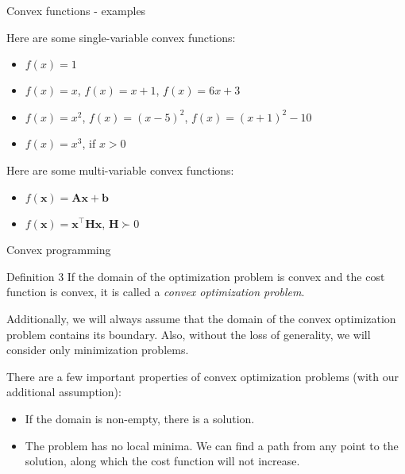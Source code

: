 \documentclass{beamer}
\begin{document}
\begin{frame}{Convex functions - examples}
	\begin{flushleft}
		
		Here are some single-variable convex functions: 
		
		\begin{itemize}
			\item $f(x) = 1$
			\item $f(x) = x$, $f(x) = x + 1$, $f(x) = 6x + 3$
			\item $f(x) = x^2$, $f(x) = (x - 5)^2$, $f(x) = (x + 1)^2 - 10$
			\item $f(x) = x^3$, if $x > 0$
		\end{itemize}
		
		\bigskip
		
		Here are some multi-variable convex functions: 
		
		\begin{itemize}
			\item $f(\mathbf{x}) = \mathbf{A}\mathbf{x} + \mathbf{b}$
			\item $f(\mathbf{x}) = \mathbf{x}^\top \mathbf{H}\mathbf{x}$, $\mathbf{H} \succ 0$ 
		\end{itemize}
		
	\end{flushleft}
\end{frame}



\begin{frame}{Convex programming}
	\begin{flushleft}
		
		\begin{block}{Definition 3}
			If the domain of the optimization problem is convex and the cost function is convex, it is called a \emph{convex optimization problem}.
		\end{block}
		
		\bigskip
		
		Additionally, we will always assume that the domain of the convex optimization problem contains its boundary. Also, without the loss of generality, we will consider only minimization problems.
		
		\bigskip
		
		There are a few important properties of convex optimization problems (with our additional assumption):
		
		\begin{itemize}
			\item If the domain is non-empty, there is a solution.
			\item The problem has no local minima. We can find a path from any point to the solution, along which the cost function will not increase.
		\end{itemize}
		
	\end{flushleft}
\end{frame}




\myqrframe
\end{document}
